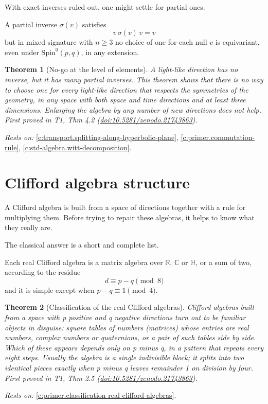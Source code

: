 \documentclass[11pt]{article}
\newtheorem{theorem}{Theorem}[section]
\theoremstyle{definition}
\theoremstyle{plain}
\providecommand{\C}{}\renewcommand{\C}{\mathbb{C}}
\providecommand{\HH}{}\renewcommand{\HH}{\mathbb{H}}
\providecommand{\R}{}\renewcommand{\R}{\mathbb{R}}
\providecommand{\Spin}{}\renewcommand{\Spin}{\mathrm{Spin}}
\begin{document}
With exact inverses ruled out, one might settle for partial ones.

A partial inverse $\sigma(v)$ satisfies \[ v\,\sigma(v)\,v = v \] but in mixed signature with $n \geq 3$ no choice of one for each null $v$ is equivariant, even under $\Spin^0(p,q)$, in any extension.

\begin{theorem}[No-go at the level of elements]\label{c:transport.no-go-level-elements}
A light-like direction has no inverse, but it has many partial inverses. This theorem shows that there is no way to choose one for every light-like direction that respects the symmetries of the geometry, in any space with both space and time directions and at least three dimensions. Enlarging the algebra by any number of new directions does not help.
\emph{First proved in} T1, Thm 4.2 (\href{https://doi.org/10.5281/zenodo.21743863}{doi:10.5281/zenodo.21743863}).
\end{theorem}
\noindent\emph{Rests on:} \ref{c:transport.splitting-along-hyperbolic-plane}, \ref{c:primer.commutation-rule}, \ref{c:std-algebra.witt-decomposition}.

\section{Clifford algebra structure}

A Clifford algebra is built from a space of directions together with a rule for multiplying them. Before trying to repair these algebras, it helps to know what they really are.

The classical answer is a short and complete list.

Each real Clifford algebra is a matrix algebra over $\R$, $\C$ or $\HH$, or a sum of two, according to the residue \[ d \equiv p - q \pmod 8 \] and it is simple except when $p - q \equiv 1 \pmod 4$.

\begin{theorem}[Classification of the real Clifford algebras]\label{c:transport.classification-real-clifford-algebras}
Clifford algebras built from a space with p positive and q negative directions turn out to be familiar objects in disguise: square tables of numbers (matrices) whose entries are real numbers, complex numbers or quaternions, or a pair of such tables side by side. Which of these appears depends only on p minus q, in a pattern that repeats every eight steps. Usually the algebra is a single indivisible block; it splits into two identical pieces exactly when p minus q leaves remainder 1 on division by four.
\emph{First proved in} T1, Thm 2.5 (\href{https://doi.org/10.5281/zenodo.21743863}{doi:10.5281/zenodo.21743863}).
\end{theorem}
\noindent\emph{Rests on:} \ref{c:primer.classification-real-clifford-algebras}.
\end{document}
